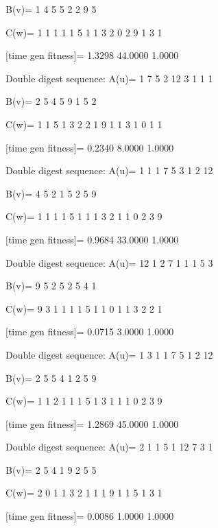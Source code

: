 B(v)=
     1     4     5     5     2     2     9     5

C(w)=
     1     1     1     1     1     5     1     1     3     2     0     2     9     1     3     1

[time gen fitness]=
    1.3298   44.0000    1.0000

Double digest sequence:
A(u)=
     1     7     5     2    12     3     1     1     1

B(v)=
     2     5     4     5     9     1     5     2

C(w)=
     1     1     5     1     3     2     2     1     9     1     1     3     1     0     1     1

[time gen fitness]=
    0.2340    8.0000    1.0000

Double digest sequence:
A(u)=
     1     1     1     7     5     3     1     2    12

B(v)=
     4     5     2     1     5     2     5     9

C(w)=
     1     1     1     1     5     1     1     1     3     2     1     1     0     2     3     9

[time gen fitness]=
    0.9684   33.0000    1.0000

Double digest sequence:
A(u)=
    12     1     2     7     1     1     1     5     3

B(v)=
     9     5     2     5     2     5     4     1

C(w)=
     9     3     1     1     1     1     5     1     1     0     1     1     3     2     2     1

[time gen fitness]=
    0.0715    3.0000    1.0000

Double digest sequence:
A(u)=
     1     3     1     1     7     5     1     2    12

B(v)=
     2     5     5     4     1     2     5     9

C(w)=
     1     1     2     1     1     1     5     1     3     1     1     1     0     2     3     9

[time gen fitness]=
    1.2869   45.0000    1.0000

Double digest sequence:
A(u)=
     2     1     1     5     1    12     7     3     1

B(v)=
     2     5     4     1     9     2     5     5

C(w)=
     2     0     1     1     3     2     1     1     1     9     1     1     5     1     3     1

[time gen fitness]=
    0.0086    1.0000    1.0000

